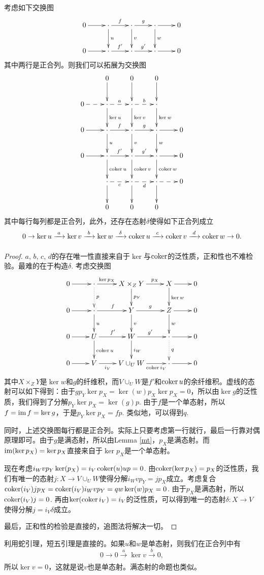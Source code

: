 \begin{lem}[蛇引理]\label{snake-lemma}
考虑如下交换图
\[
	\xymatrix{
	0\ar[r]&\cdot \ar[r]^{f}\ar[d]^{u}&\cdot \ar[r]^{g}\ar[d]^{v}&\cdot \ar[r]\ar[d]^{w}&0\\
	0\ar[r]&\cdot \ar[r]^{f'}&\cdot \ar[r]^{g'}&\cdot \ar[r]&0\\
	}
\]
其中两行是正合列。则我们可以拓展为交换图
\[
	\xymatrix{
	&0\ar[d]&0\ar[d]&0\ar[d]&\\
	0\ar@{-->}[r]&\cdot\ar@{-->}[r]^a\ar[d]^{\ker u}&\cdot\ar@{-->}[r]^b\ar[d]^{\ker v}&\cdot\ar[d]^{\ker w}&\\
	0\ar[r]&\cdot \ar[r]^{f}\ar[d]^{u}&\cdot \ar[r]^{g}\ar[d]^{v}&\cdot \ar[r]\ar[d]^{w}&0\\
	0\ar[r]&\cdot \ar[r]^{f'}\ar[d]^{\coker u}&\cdot \ar[r]^{g'}\ar[d]^{\coker v}&\cdot \ar[r]\ar[d]^{\coker w}&0\\
	&\cdot \ar@{-->}[r]_c\ar[d] &\cdot \ar@{-->}[r]_d\ar[d] &\cdot \ar@{-->}[r]\ar[d]& 0\\
	&0&0&0&\\
	}
\]
其中每行每列都是正合列，此外，还存在态射$\delta$使得如下正合列成立
\[
	0\to \ker u \xrightarrow[~~~]{a}\ker v \xrightarrow[~~~]{b}\ker w \xrightarrow[~~~]{\delta}\operatorname{coker} u \xrightarrow[~~~]{c}\operatorname{coker} v \xrightarrow[~~~]{d}\operatorname{coker} w \to 0.
\]
\end{lem}

\begin{proof}
$a$, $b$, $c$, $d$的存在唯一性直接来自于$\ker$与$\operatorname{coker}$的泛性质，正和性也不难检验。最难的在于构造$\delta$. 考虑交换图
\[
	\xymatrix{
	0\ar[r]&\cdot \ar[r]^-{\ker p_X}\ar@{.>}[d]^p&X\times_Z Y \ar[r]^-{p_X}\ar[d]^{p_Y}&X\ar[d]^{\ker w}\ar[r]&0\\
	0\ar[r]&\cdot \ar[r]^{f}\ar[d]^{u}&Y \ar[r]^{g}\ar[d]^{v}&Z \ar[d]^{w}\ar[r]&0\\
	0\ar[r]&U \ar[r]^{f'}\ar[d]^{\coker u}&W \ar[r]^{g'}\ar[d]^{i_W}&\cdot \ar@{.>}[d]^q\ar[r]&0\\
	0\ar[r]&V \ar[r]_-{i_V}&V\cup_U W \ar[r]_-{\coker i_V}&\cdot\ar[r]&0
	}
\]
其中$X\times_Z Y$是$\ker w$和$g$的纤维积，而$V\cup_U W$是$f'$和$\operatorname{coker} u$的余纤维积。虚线的态射可以如下得到：由于$gp_Y \ker p_X=\ker(w)p_X\ker p_X=0$，所以由$\ker g$的泛性质，我们得到了分解$p_Y\ker p_X=\ker(g)p$. 由于$f$是一个单态射，所以$f=\operatorname{im} f=\ker g$，于是$p_Y\ker p_X=fp$. 类似地，可以得到$q$.

同时，上述交换图每行都是正合列。实际上只要考虑第一行就行，最后一行靠对偶原理即可。由于$g$是满态射，所以由Lemma \ref{mt}，$p_X$是满态射。而$\operatorname{im}(\ker p_X)=\ker p_X$直接来自于$\ker p_X$是一个单态射。

现在考虑$i_Wvp_Y\ker(p_X)=i_V\operatorname{coker}(u)up=0$. 由$\operatorname{coker}(\ker p_X)=p_X$的泛性质，我们有唯一的态射$j:X\to V\cup_U W$使得分解$i_Wvp_Y=jp_X$成立。考虑复合$\operatorname{coker}(i_V)jp_X=\operatorname{coker}(i_V)i_Wvp_Y=qw\ker(w)p_X=0$. 由于$p_X$是满态射，所以$\operatorname{coker}(i_V)j=0$. 再由$\ker(\operatorname{coker} i_V)=i_V$的泛性质，可以得到唯一的态射$\delta:X\to V$使得分解$j=i_V \delta$成立。

最后，正和性的检验是直接的，追图法将解决一切。
\end{proof}

利用蛇引理，短五引理是直接的。如果$u$和$w$是单态射，则我们在正合列中有
\[
	0\to 0 \xrightarrow[~~~]{a}\ker v \xrightarrow[~~~]{b}0,
\]
所以$\ker v=0$，这就是说$v$也是单态射。满态射的命题也类似。